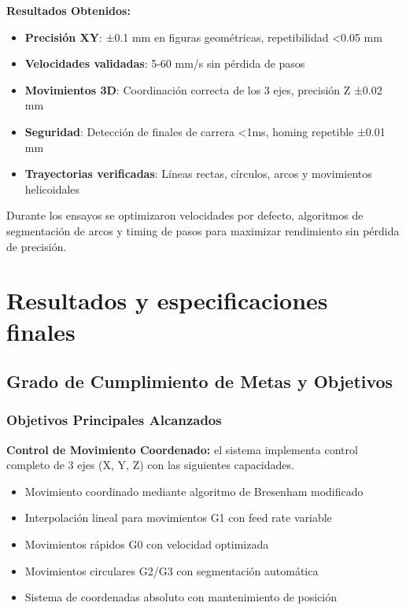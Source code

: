 \documentclass[12pt]{article}
\begin{document}
\textbf{Resultados Obtenidos:}
\begin{itemize}
    \item \textbf{Precisión XY}: ±0.1 mm en figuras geométricas, repetibilidad <0.05 mm
    \item \textbf{Velocidades validadas}: 5-60 mm/s sin pérdida de pasos
    \item \textbf{Movimientos 3D}: Coordinación correcta de los 3 ejes, precisión Z ±0.02 mm
    \item \textbf{Seguridad}: Detección de finales de carrera <1ms, homing repetible ±0.01 mm
    \item \textbf{Trayectorias verificadas}: Líneas rectas, círculos, arcos y movimientos helicoidales
\end{itemize}

Durante los ensayos se optimizaron velocidades por defecto, algoritmos de segmentación de arcos y timing de pasos para maximizar rendimiento sin pérdida de precisión.


\section{Resultados y especificaciones finales}

\subsection{Grado de Cumplimiento de Metas y Objetivos}

\subsubsection{Objetivos Principales Alcanzados}

\textbf{Control de Movimiento Coordenado:} el sistema implementa control completo de 3 ejes (X, Y, Z) con las siguientes capacidades.
\begin{itemize}
    \item Movimiento coordinado mediante algoritmo de Bresenham modificado
    \item Interpolación lineal para movimientos G1 con feed rate variable
    \item Movimientos rápidos G0 con velocidad optimizada
    \item Movimientos circulares G2/G3 con segmentación automática
    \item Sistema de coordenadas absoluto con mantenimiento de posición
\end{itemize}
\end{document}
